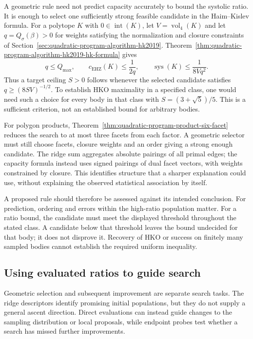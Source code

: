 A geometric rule need not predict capacity accurately to bound the systolic
ratio. It is enough to select one sufficiently strong feasible candidate in
the Haim--Kislev formula. For a polytope $K$ with
$0\in\operatorname{int}(K)$, let $V=\operatorname{vol}_4(K)$ and let
$q=Q_\sigma(\beta)>0$ for weights satisfying the normalization and closure
constraints of Section~\ref{sec:quadratic-program-algorithm-hk2019}.
Theorem~\ref{thm:quadratic-program-algorithm-hk2019-hk-formula} gives
\[
 q\leq Q_{\max},\qquad
 c_{\mathrm{EHZ}}(K)\leq\frac1{2q},\qquad
 \operatorname{sys}(K)\leq\frac1{8Vq^2}.
\]
Thus a target ceiling $S>0$ follows whenever the selected candidate satisfies
$q\geq(8SV)^{-1/2}$. To establish HKO maximality in a specified class,
one would need such a choice for every body in that class with
$S=(3+\sqrt5)/5$. This is a sufficient criterion, not an established
bound for arbitrary bodies.

For polygon products, Theorem~\ref{thm:quadratic-program-product-six-facet}
reduces the search to at most three facets from each factor. A geometric selector
must still choose facets, closure weights and an order giving a strong
enough candidate. The ridge sum aggregates absolute pairings of all primal
edges; the capacity formula instead uses signed pairings of dual facet
vectors, with weights constrained by closure. This identifies structure
that a sharper explanation could use, without explaining the observed
statistical association by itself.

A proposed rule should therefore be assessed against its intended conclusion.
For prediction, ordering and errors within the high-ratio population matter.
For a ratio bound, the candidate must meet the displayed threshold throughout
the stated class. A candidate below that threshold leaves the bound undecided
for that body; it does not disprove it. Recovery of HKO or success on finitely
many sampled bodies cannot establish the required uniform inequality.

\subsection{Using evaluated ratios to guide search}

Geometric selection and subsequent improvement are separate search tasks.
The ridge descriptors identify promising initial populations, but they do
not supply a general ascent direction. Direct evaluations can instead
guide changes to the sampling distribution or local proposals, while
endpoint probes test whether a search has missed further improvements.

